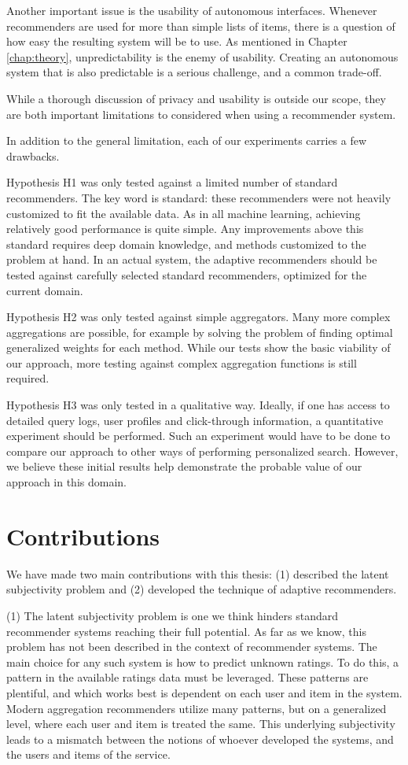 Another important issue is the usability of autonomous interfaces.
Whenever recommenders are used for more than simple lists of items,
there is a question of how easy the resulting system will be to use.
As mentioned in Chapter \ref{chap:theory},
unpredictability is the enemy of usability.
Creating an autonomous system that is also
predictable is a serious challenge, and a common trade-off.

While a thorough discussion of privacy and usability is 
outside our scope, they are both important limitations to considered
when using a recommender system.

In addition to the general limitation, each of our experiments
carries a few drawbacks.

Hypothesis H1 was only tested against a limited number of standard recommenders.
The key word is standard: these recommenders were not heavily customized
to fit the available data. As in all machine learning,
achieving relatively good performance is quite simple.
Any improvements above this standard requires deep domain knowledge,
and methods customized to the problem at hand.
In an actual system, the adaptive recommenders should be tested
against carefully selected standard recommenders,
optimized for the current domain.

Hypothesis H2 was only tested against simple aggregators.
Many more complex aggregations are possible,
for example by solving the problem of finding
optimal generalized weights for each method.
While our tests show the basic viability of our approach,
more testing against complex aggregation functions
is still required.

Hypothesis H3 was only tested in a qualitative way.
Ideally, if one has access to detailed query logs,
user profiles and click-through information,
a quantitative experiment should be performed.
Such an experiment would have to be done
to compare our approach to other ways of performing
personalized search.
However, we believe these initial results
help demonstrate the probable value of our approach
in this domain.


\section{Contributions} 

We have made two main contributions with this thesis:
(1) described the latent subjectivity problem and
(2) developed the technique of adaptive recommenders.

(1) The latent subjectivity problem is one we think hinders
standard recommender systems reaching their full potential.
As far as we know, this problem has not been described
in the context of recommender systems.
The main choice for any such system is how to predict unknown ratings.
To do this, a pattern in the available ratings data must be leveraged.
These patterns are plentiful, and which works best is dependent on
each user and item in the system.
Modern aggregation recommenders utilize many patterns, but on a generalized
level, where each user and item is treated the same.
This underlying subjectivity leads to a mismatch between the notions
of whoever developed the systems, and the users and items of the service.

